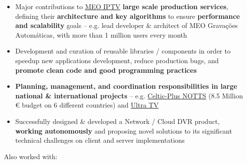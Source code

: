 \documentclass[10pt,a4paper]{altacv}
\begin{document}
\divider

\begin{itemize}
	\item Major contributions to \href{https://www.meo.pt/tv}{MEO IPTV} \textbf{large scale production services}, defining their \textbf{architecture and key algorithms} to ensure \textbf{performance and scalability} goals -- e.g. lead developer \& architect of MEO Gravações Automáticas, with more than 1 million users every month
	\item Development and curation of reusable libraries / components in order to speedup new applications development, reduce production bugs, and \textbf{promote clean code and good programming practices}
	\item \textbf{Planning, management, and coordination responsibilities in large national \& international projects} -- e.g. \href{http://www.alticelabs.com/gapott/}{Celtic-Plus NOTTS} (8.5 Million € budget on 6 different countries) and \href{http://www.alticelabs.com/site/ultratv/}{Ultra TV}
\end{itemize}

\divider


\begin{itemize}
\item Successfully designed \& developed a Network / Cloud DVR product, \textbf{working autonomously} and proposing novel solutions to its significant technical challenges on client and server implementations
\end{itemize}

\clearpage


    
   
    
           

\divider
Also worked with: \\
       
       
   
\end{document}
